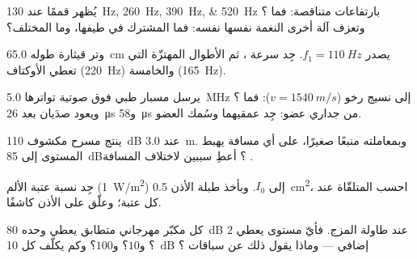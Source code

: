 \begin{exercise}[$\star\star$]\label{exo:g12:sound-acoustics:10}
يُظهر  قممًا عند \qtylist{130;260;390;520}{Hz}
بارتفاعات متناقصة: فما ؟ وتعزف آلة أخرى
النغمة نفسها  نفسه: فما المشترك في طيفها، وما المختلف؟
\end{exercise}

\begin{exercise}[$\star\star$]\label{exo:g12:sound-acoustics:11}
وتر قيثارة طوله \qty{65.0}{cm} يصدر
$f_1 = \qty{110}{Hz}$. جِد سرعة ، ثم الأطوال
المهتزّة التي تعطي الأوكتاف (\qty{220}{Hz}) والخامسة (\qty{165}{Hz}).
\end{exercise}

\begin{exercise}[$\star\star\star$]\label{exo:g12:sound-acoustics:12}
يرسل مسبار طبي  فوق صوتية تواترها \qty{5.0}{MHz} إلى نسيج رخو
($v = \qty{1540}{m/s}$): فما ؟ ويعود صدَيان بعد
\qty{26}{\micro s} و\qty{58}{\micro s} من جداري عضو:
جِد عمقيهما وسُمك العضو.
\end{exercise}

\begin{exercise}[$\star\star\star$]\label{exo:g12:sound-acoustics:13}
ينتج مسرح مكشوف \qty{110}{dB} عند \qty{3.0}{m}. وبمعاملته
منبعًا صغيرًا، على أي مسافة يهبط المستوى إلى
\qty{85}{dB}؟ أعطِ سببين لاختلاف المسافة .
\end{exercise}

\begin{exercise}[$\star\star\star$]\label{exo:g12:sound-acoustics:14}
جِد نسبة عتبة الألم (\qty{1}{W/m^2}) إلى $I_0$.
وبأخذ طبلة الأذن \qty{0.5}{cm^2}، احسب  المتلقّاة
عند كل عتبة؛ وعلّق على الأذن كاشفًا.
\end{exercise}

\begin{exercise}[$\star\star\star$]\label{exo:g12:sound-acoustics:15}
كل مكبّر  مهرجاني متطابق يعطي وحده \qty{80}{dB} عند
طاولة المزج. فأيّ مستوى يعطي $2$؟ و$10$؟ و$100$؟ وكم يكلّف كل
\qty{+10}{dB} إضافي --- وماذا يقول ذلك عن سباقات ؟
\end{exercise}

